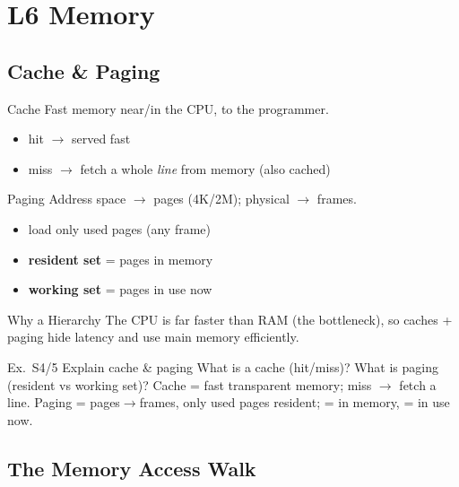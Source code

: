 \section{L6 Memory}

\subsection{Cache \& Paging}


\begin{definition}{Cache}
    Fast memory near/in the CPU,  to the programmer.
    \begin{itemize}
        \item hit $\to$ served fast
        \item miss $\to$ fetch a whole \emph{line} from memory (also cached)
    \end{itemize}
\end{definition}

\begin{definition}{Paging}
    Address space $\to$ pages (4K/2M); physical $\to$ frames.
    \begin{itemize}
        \item load only used pages (any frame)
        \item \textbf{resident set} = pages in memory
        \item \textbf{working set} = pages in use now
    \end{itemize}
\end{definition}

\multend

\begin{concept}{Why a Hierarchy}
    The CPU is far faster than RAM (the bottleneck), so caches + paging hide latency and use main memory efficiently.
\end{concept}

\begin{example2}{Ex.\ S4/5 Explain cache \& paging}
    What is a cache (hit/miss)? What is paging (resident vs working set)?
    \tcblower
    Cache = fast transparent memory; miss $\to$ fetch a line. Paging = pages$\to$frames, only used pages resident;  = in memory,  = in use now.
\end{example2}

\subsection{The Memory Access Walk}

